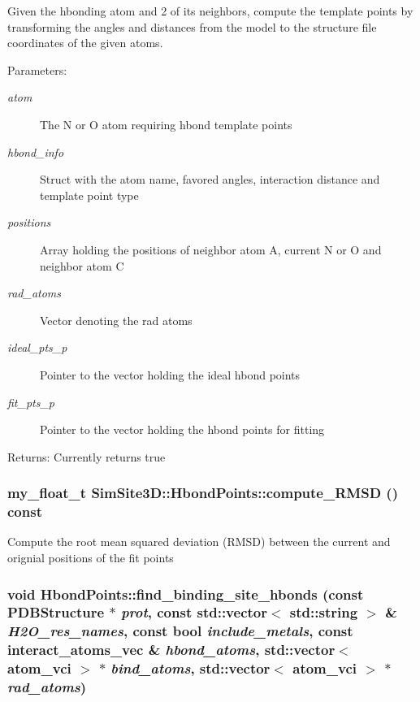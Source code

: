 Given the hbonding atom and 2 of its neighbors, compute the template points by transforming the angles and distances from the model to the structure file coordinates of the given atoms.

\begin{Desc}
\item[Parameters:]
\begin{description}
\item[{\em atom}]The N or O atom requiring hbond template points \item[{\em hbond\_\-info}]Struct with the atom name, favored angles, interaction distance and template point type \item[{\em positions}]Array holding the positions of neighbor atom A, current N or O and neighbor atom C \item[{\em rad\_\-atoms}]Vector denoting the rad atoms \item[{\em ideal\_\-pts\_\-p}]Pointer to the vector holding the ideal hbond points \item[{\em fit\_\-pts\_\-p}]Pointer to the vector holding the hbond points for fitting \end{description}
\end{Desc}
\begin{Desc}
\item[Returns:]Currently returns true \end{Desc}
\subsubsection{\setlength{\rightskip}{0pt plus 5cm}my\_\-float\_\-t SimSite3D::Hbond\-Points::compute\_\-RMSD () const\hspace{0.3cm}{\tt  [inline]}}\label{classSimSite3D_1_1HbondPoints_ff599a0e97c9b535f644765f8a63be1f}


Compute the root mean squared deviation (RMSD) between the current and orignial positions of the fit points 
\subsubsection{\setlength{\rightskip}{0pt plus 5cm}void Hbond\-Points::find\_\-binding\_\-site\_\-hbonds (const \bf{PDBStructure} $\ast$ {\em prot}, const std::vector$<$ std::string $>$ \& {\em H2O\_\-res\_\-names}, const bool {\em include\_\-metals}, const interact\_\-atoms\_\-vec \& {\em hbond\_\-atoms}, std::vector$<$ atom\_\-vci $>$ $\ast$ {\em bind\_\-atoms}, std::vector$<$ atom\_\-vci $>$ $\ast$ {\em rad\_\-atoms})}\label{classSimSite3D_1_1HbondPoints_4ac75a890a38f90de37bd4793da50fef}


